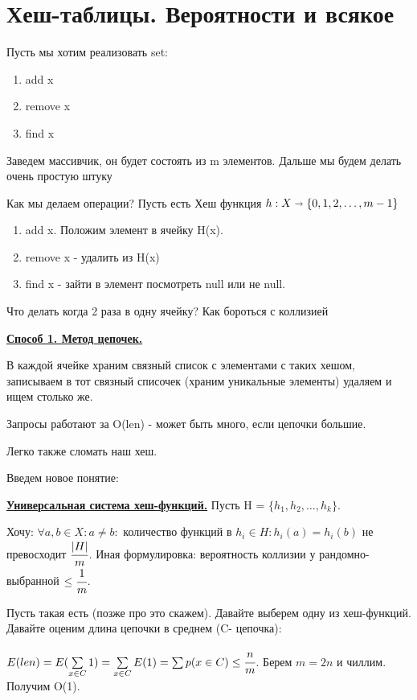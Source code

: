 \documentclass{article}
\newcommand{\deff}[1]{\underline{\textbf{#1}}}
\begin{document}
\pagebreak

\section{Хеш-таблицы. Вероятности и всякое}

Пусть мы хотим реализовать set:
\begin{enumerate}
    \item add x
    \item remove x 
    \item find x
\end{enumerate}

Заведем массивчик, он будет состоять из m элементов. Дальше мы будем делать очень простую штуку

Как мы делаем операции?  Пусть есть Хеш функция $h: X \shortrightarrow \{0,1,2,\ldots,m-1\}$

\begin{enumerate}
    \item add x. Положим элемент в ячейку H(x).
    \item remove x - удалить из H(x)
    \item find x - зайти в элемент посмотреть null или не null.
\end{enumerate}

Что делать когда 2 раза в одну ячейку? Как бороться с коллизией

\deff{Способ 1. Метод цепочек.} 

В каждой ячейке храним связный список с элементами с таких хешом, записываем в тот связный списочек (храним уникальные элементы) удаляем и ищем столько же.  

Запросы работают за O(len) - может быть много, если цепочки большие.

Легко также сломать наш хеш.

Введем новое понятие:

\deff{Универсальная система хеш-функций.} Пусть H = $\{h_1,h_2,\ldots,h_k\}$.

Хочу:
$\forall a,b \in X: a\neq b:$ количество функций в $h_i \in H: h_i(a)=h_i(b)$ не превосходит $\cfrac{|H|}{m}$. Иная формулировка: вероятность коллизии у рандомно-выбранной $\leq \cfrac{1}{m}$.

Пусть такая есть (позже про это скажем). Давайте выберем одну из хеш-функций. Давайте оценим длина цепочки в среднем (C- цепочка):

$E(len)= E(\sum\limits_{x\in C} 1) = \sum\limits_{x\in C} E(1) = \sum p(x\in C) \leq \cfrac{n}{m}$. Берем $m = 2n$  и чиллим. Получим O(1).
\end{document}
